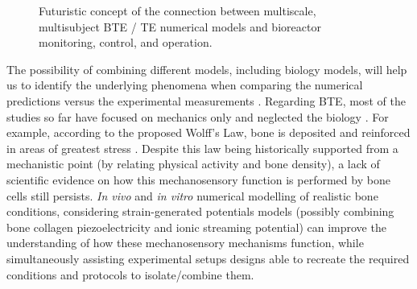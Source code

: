 \begin{figure}
\caption{Futuristic concept of the connection between multiscale, multisubject \acs{BTE} / \acs{TE} numerical models and bioreactor monitoring, control, and operation.}
\label{figFuture}
\end{figure}        

The possibility of combining different models, including biology models, will help us to identify the underlying phenomena when comparing the numerical predictions versus the experimental measurements \cite{Geris2018-tz}. Regarding \acs{BTE}, most of the studies so far have focused on mechanics only and neglected the biology \cite{Vetsch2015-xz}. For example, according to the proposed Wolff's Law, bone is deposited and reinforced in areas of greatest stress \cite{Ahn2009-ja}. Despite this law being historically supported from a mechanistic point (by relating physical activity and bone density), a lack of scientific evidence on how this mechanosensory function is performed by bone cells still persists. \textit{In vivo} and \textit{in vitro} numerical modelling of realistic bone conditions, considering strain-generated potentials models (possibly combining bone collagen piezoelectricity and ionic streaming potential) can improve the understanding of how these mechanosensory mechanisms function, while simultaneously assisting experimental setups designs able to recreate the required conditions and protocols to isolate/combine them.


